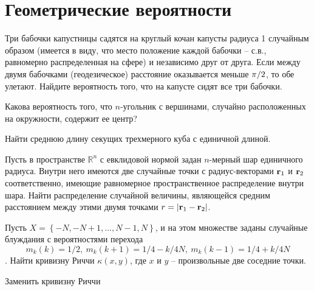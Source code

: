 \section{Геометрические вероятности}

\begin{problem}

Три бабочки капустницы садятся на круглый кочан капусты радиуса 1 случайным образом (имеется в виду, что место положение каждой бабочки -- с.в., равномерно распределенная на сфере) и независимо друг от друга. Если между двумя бабочками (геодезическое) расстояние оказывается меньше ${\pi \mathord{\left/ {\vphantom {\pi  2}} \right. \kern-\nulldelimiterspace} 2} $, то обе улетают. Найдите вероятность того, что на капусте сидят все три бабочки.

\end{problem}

\begin{problem}
Какова вероятность того, что $n$-угольник с вершинами, случайно расположенных на окружности, содержит ее центр?
\end{problem}

\begin{problem}
Найти среднюю длину секущих трехмерного куба с единичной длиной.
\end{problem}

\begin{problem}
Пусть в пространстве $\mathbb R^n$ с евклидовой нормой задан $n$-мерный шар единичного радиуса. Внутри него имеются две случайные точки с радиус-векторами ${\bf{r}}_1$ и ${\bf{r}}_2$ соответственно, имеющие равномерное пространственное распределение внутри шара. Найти распределение случайной величины, являющейся средним расстоянием между этими двумя точками $r = \left|{\bf r}_1 - {\bf r}_2\right|$.
\end{problem}

\begin{problem}
Пусть $X = \left\{-N, -N + 1, ..., N - 1, N\right\}$, и на этом множестве заданы случайные блуждания с вероятностями перехода $$m_k\left(k\right) = 1/2,\  m_k\left(k+1\right) = 1/4 - k/4N,\  m_k\left(k-1\right) = 1/4 + k/4N$$.  Найти кривизну Риччи  $\kappa\left(x, y\right)$, где $x$ и $y$ -- произвольные две соседние точки.

\begin{fixme}
Заменить кривизну Риччи
\end{fixme}

\end{problem}